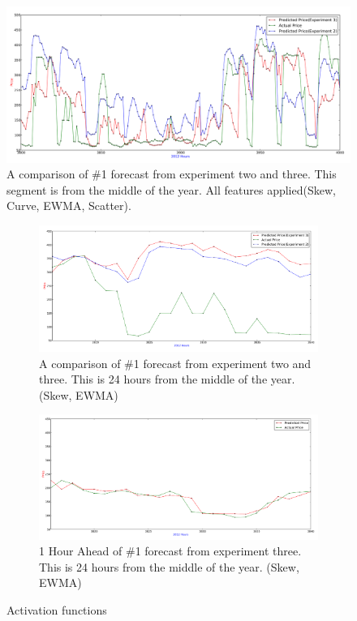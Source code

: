 \begin{figure}[H]
\centering
\includegraphics[width=\linewidth]{billeder/PriceExperimentalAnalysis/X2_X3_AllFeatures_3800_4000.png}
\caption{A comparison of \#1 forecast from experiment two and three. This segment is from the middle of the year. All features applied(Skew, Curve, EWMA, Scatter).}
\label{fig:X2_X3_AllParameters_3800_4000}
\end{figure}

\begin{figure}[H]
\centering
\begin{subfigure}{.5\textwidth}
  \centering
	\includegraphics[width=\linewidth]{billeder/PriceExperimentalAnalysis/X2_X3_3816_3840.png}
	\caption{A comparison of \#1 forecast from experiment two and three. This is 24 hours from the middle of the year. (Skew, EWMA)}
	\label{fig:X2_X3_3816_3840}
\end{subfigure}%
\begin{subfigure}{.5\textwidth}
  \centering
	\includegraphics[width=\linewidth]{billeder/PriceExperimentalAnalysis/X2_X3_3816_3840_1hourAhead.png}
	\caption{1 Hour Ahead of \#1 forecast from experiment three. This is 24 hours from the middle of the year. (Skew, EWMA)}
	\label{fig:X2_X3_3816_3840_1hourahead}
\end{subfigure}
\caption{Activation functions}
\label{fig:1hourAhead}
\end{figure}

